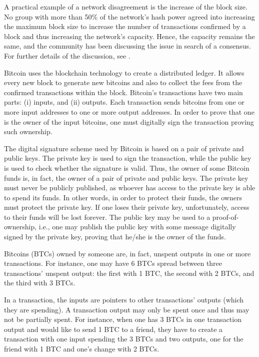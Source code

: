 A practical example of a network disagreement is the increase of the block size. No group with more than 50\% of the network's hash power agreed into increasing the maximum block size to increase the number of transactions confirmed by a block and thus increasing the network's capacity. Hence, the capacity remains the same, and the community has been discussing the issue in search of a consensus. For further details of the discussion, see \citet{bitcoinblocksize}.

Bitcoin uses the blockchain technology to create a distributed ledger. It allows every new block to generate new bitcoins and also to collect the fees from the confirmed transactions within the block. Bitcoin's transactions have two main parts: (i) inputs, and (ii) outputs. Each transaction sends bitcoins from one or more input addresses to one or more output addresses. In order to prove that one is the owner of the input bitcoins, one must digitally sign the transaction proving such ownership.

The digital signature scheme used by Bitcoin is based on a pair of private and public keys. The private key is used to sign the transaction, while the public key is used to check whether the signature is valid. Thus, the owner of some Bitcoin funds is, in fact, the owner of a pair of private and public keys. The private key must never be publicly published, as whoever has access to the private key is able to spend its funds. In other words, in order to protect their funds, the owners must protect the private key. If one loses their private key, unfortunately, access to their funds will be lost forever. The public key may be used to a proof-of-ownership, i.e., one may publish the public key with some message digitally signed by the private key, proving that he/she is the owner of the funds.

Bitcoins (BTCs) owned by someone are, in fact, unspent outputs in one or more transactions. For instance, one may have 6 BTCs spread between three transactions' unspent output: the first with 1 BTC, the second with 2 BTCs, and the third with 3 BTCs.

In a transaction, the inputs are pointers to other transactions' outputs (which they are spending). A transaction output may only be spent once and thus may not be partially spent. For instance, when one has 3 BTCs in one transaction output and would like to send 1 BTC to a friend, they have to create a transaction with one input spending the 3 BTCs and two outputs, one for the friend with 1 BTC and one's change with 2 BTCs.

